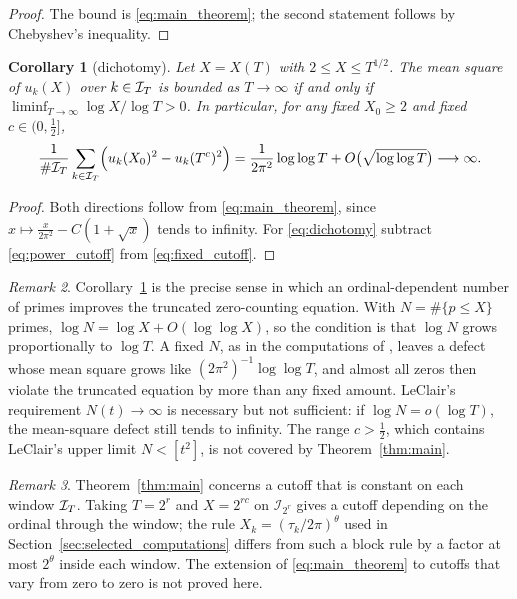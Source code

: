 \documentclass[11pt,reqno]{amsart}
\theoremstyle{plain}\newtheorem{theorem}{Theorem}[section]\newtheorem{proposition}[theorem]{Proposition}\newtheorem{lemma}[theorem]{Lemma}\newtheorem{corollary}[theorem]{Corollary}
\theoremstyle{definition}\newtheorem{hypothesis}[theorem]{Hypothesis}\newtheorem{definition}[theorem]{Definition}
\theoremstyle{remark}\newtheorem{remark}[theorem]{Remark}\newtheorem{experiment}[theorem]{Experiment}\newtheorem{question}[theorem]{Question}\newtheorem{heuristic}[theorem]{Heuristic}\newtheorem{conjecture}[theorem]{Conjecture}
\begin{document}
\begin{proof}
The bound is \eqref{eq:main_theorem}; the second statement follows by Chebyshev's inequality.
\end{proof}

\begin{corollary}[dichotomy]\label{cor:dichotomy}
Let $X=X(T)$ with $2\le X\le T^{1/2}$. The mean square of $u_k(X)$ over $k\in\mathcal I_T$ is bounded as $T\to\infty$ if and only if $\liminf_{T\to\infty}\log X/\log T>0$. In particular, for any fixed $X_0\ge2$ and fixed $c\in(0,\frac12]$,
\begin{equation}
\frac1{\#\mathcal I_T}\sum_{k\in\mathcal I_T}\Bigl(u_k(X_0)^2-u_k(T^c)^2\Bigr)=\frac1{2\pi^2}\log\log T+O\bigl(\sqrt{\log\log T}\bigr)\longrightarrow\infty .
\label{eq:dichotomy}
\end{equation}
\end{corollary}

\begin{proof}
Both directions follow from \eqref{eq:main_theorem}, since $x\mapsto\frac{x}{2\pi^2}-C(1+\sqrt x)$ tends to infinity. For \eqref{eq:dichotomy} subtract \eqref{eq:power_cutoff} from \eqref{eq:fixed_cutoff}.
\end{proof}

\begin{remark}\label{rem:comparison_LeClair}
Corollary~\ref{cor:dichotomy} is the precise sense in which an ordinal-dependent number of primes improves the truncated zero-counting equation. With $N=\#\{p\le X\}$ primes, $\log N=\log X+O(\log\log X)$, so the condition is that $\log N$ grows proportionally to $\log T$. A fixed $N$, as in the computations of \cite[Sect.~VI]{LeClair2021}, leaves a defect whose mean square grows like $(2\pi^2)^{-1}\log\log T$, and almost all zeros then violate the truncated equation by more than any fixed amount. LeClair's requirement $N(t)\to\infty$ \cite[Sect.~III]{LeClair2021} is necessary but not sufficient: if $\log N=o(\log T)$, the mean-square defect still tends to infinity. The range $c>\frac12$, which contains LeClair's upper limit $N<[t^2]$, is not covered by Theorem~\ref{thm:main}.
\end{remark}

\begin{remark}\label{rem:block_rule}
Theorem~\ref{thm:main} concerns a cutoff that is constant on each window $\mathcal I_T$. Taking $T=2^r$ and $X=2^{rc}$ on $\mathcal I_{2^r}$ gives a cutoff depending on the ordinal through the window; the rule $X_k=(\tau_k/2\pi)^\theta$ used in Section~\ref{sec:selected_computations} differs from such a block rule by a factor at most $2^\theta$ inside each window. The extension of \eqref{eq:main_theorem} to cutoffs that vary from zero to zero is not proved here.
\end{remark}
\end{document}
